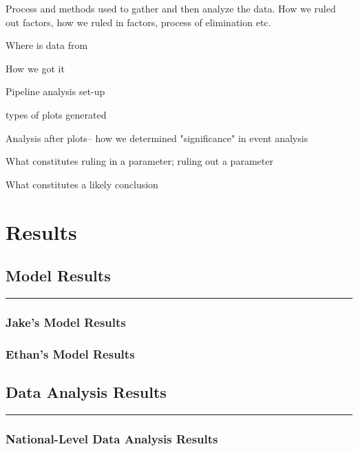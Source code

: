 \documentclass[twoside]{article}
\begin{document}
\begin{multicols}{2}
Process and methods used to gather and then analyze the data. How we ruled out factors, how we ruled in factors, process of elimination etc. 
\begin{compactitem}
	\item Where is data from
	\item How we got it
	\item Pipeline analysis set-up
	\item types of plots generated
	\item Analysis after plots-- how we determined "significance" in event analysis
	\item What constitutes ruling in a parameter; ruling out a parameter 
	\item What constitutes a likely conclusion
\end{compactitem}






\section{Results}
\subsection{Model Results}
\rule{\linewidth}{0.25pt}

\subsubsection{Jake's Model Results}

\subsubsection{Ethan's Model Results}

\subsection{Data Analysis Results}
\rule{\linewidth}{0.25pt}

\subsubsection{National-Level Data Analysis Results}


\end{multicols}
\end{document}
